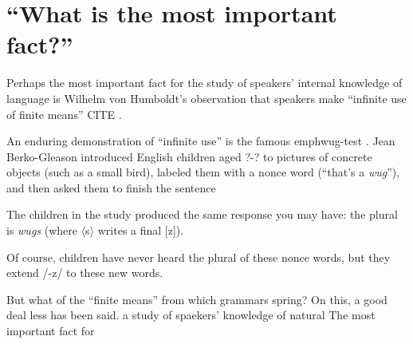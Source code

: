 \section{``What is the most important fact?''}

Perhaps the most important fact for the study of speakers' internal knowledge of language is Wilhelm von Humboldt's observation that speakers make ``infinite use of finite means'' CITE \citep{Chomsky1966}. 

An enduring demonstration of ``infinite use'' is the famous emph{wug-test} \citep{Berko1958}. Jean Berko-Gleason introduced English children aged ?-? to pictures of concrete objects (such as a small bird), labeled them with a nonce word (``that's a \emph{wug}''), and then asked them to finish the sentence

The children in the study produced the same response you may have: the plural is \emph{wugs} (where $\langle$s$\rangle$ writes a final [z]). 

Of course, children have never heard the plural of these nonce words, but they extend /-z/ to these new words. 

But what of the ``finite means'' from which grammars spring? On this, a good deal less has been said.
a study of spaekers' knowledge of natural
The most important fact for 
